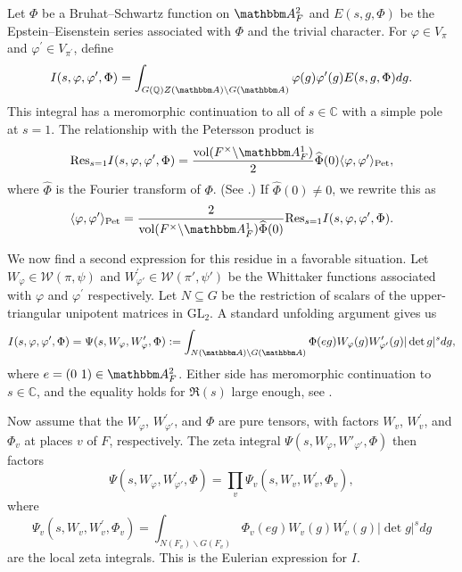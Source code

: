 \documentclass[10pt, twoside]{amsart}
\theoremstyle{plain}
\theoremstyle{definition}
\theoremstyle{remark}
\numberwithin{equation}{subsection}
\def\Q{\mathbb Q}
\def\C{\mathbb C}
\def\A{\mathbbm A}
\def\GL{\mathrm{GL}}
\def\Res{\mathrm{Res}}
\def\Pet{\mathrm{Pet}}
\def\calw{\mathcal W}
\begin{document}
Let $\Phi$ be a Bruhat--Schwartz function on $\A_F^2$ and $E(s, g, \Phi)$ be the Epstein--Eisenstein series associated with $\Phi$ and the trivial character.  For $\varphi \in V_\pi$ and $\varphi^\prime \in V_{\pi^\prime} $, define
$$
I(s, \varphi, \varphi^\prime, \Phi) = \int_{G(\Q) Z(\A) \backslash G(\A) } \varphi (g) \varphi^\prime (g) E(s, g,  \Phi) dg.
$$
This integral has a meromorphic continuation to all of $s \in \C$ with a simple pole at $s=1$. The relationship with the Petersson product is
\begin{equation}
\Res_{s=1} I(s, \varphi, \varphi^\prime, \Phi) = \frac{\mathrm{vol}(F^\times \backslash \A_F^1)}{2} \widehat \Phi (0) \langle \varphi, \varphi^\prime \rangle_\Pet,
\end{equation}
where $\widehat \Phi$ is the Fourier transform of $\Phi$. (See \cite[Eqn.\ (2.1.1)]{BaRa}.) If $\widehat \Phi (0) \neq 0$, we rewrite this as
\begin{equation}\label{eqn: residue-Petersson}
 \langle \varphi, \varphi^\prime \rangle_\Pet =\frac{2}{\mathrm{vol}(F^\times \backslash \A_F^1) \widehat \Phi (0)} \Res_{s=1} I(s, \varphi, \varphi^\prime, \Phi) .
\end{equation}

We now find a second expression for this residue in a favorable situation. Let $W_{\varphi} \in \calw(\pi,\psi)$ and $W^\prime_{\varphi'}\in\calw(\pi',\psi')$ be the Whittaker functions associated with $\varphi$ and $\varphi^\prime$ respectively. Let $N \subseteq G$ be the restriction of scalars of the upper-triangular unipotent matrices in $\GL_2$. A standard unfolding argument gives us
\begin{equation}\label{eqn:zeta-integral}
I(s, \varphi, \varphi^\prime, \Phi ) = \Psi (s, W_{\varphi}, W_{\varphi}^\prime, \Phi) := \int_{N(\A) \backslash G(\A)} \Phi (e g) W_{\varphi}(g) W_{\varphi'}^\prime (g) |\det g|^{s} dg,
\end{equation}
where $e = (0 \ 1) \in \A_F^2$. Either side has meromorphic continuation to $s \in \C$, and the equality holds for $\Re (s)$ large enough, see \cite[\S 4.5]{JacqSha}.

Now assume that the $W_{\varphi}$, $W_{\varphi'}^\prime$, and $\Phi$ are  pure tensors, with factors $W_v$, $W_v^\prime$, and $\Phi_v$ at places $v$ of $F$, respectively. The zeta integral $\Psi(s,W_\varphi,W'_{\varphi'},\Phi)$ then factors 
\begin{equation*}
\Psi (s, W_{\varphi}, W_{\varphi'}^\prime, \Phi) = \prod_{v} \Psi_v (s, W_v, W_v^\prime, \Phi_v),
\end{equation*}
where
$$
\Psi_v (s, W_v, W_v^\prime, \Phi_v) = \int_{N(F_v) \backslash G(F_v)} \Phi_v (e g) W_v(g) W_v^\prime (g) |\det g|^{s} dg
$$
are the local zeta integrals. This is the Eulerian expression for $I$. 
\end{document}
